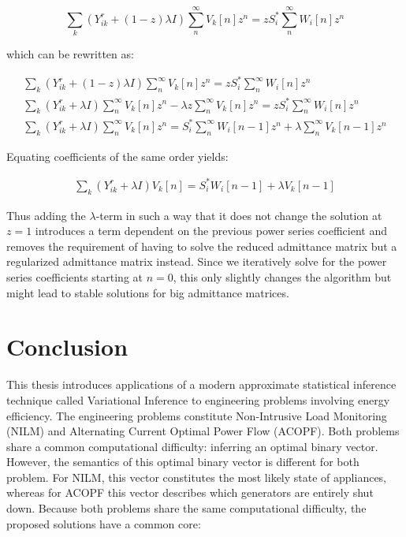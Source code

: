 \documentclass[11pt]{cmuthesis} %
\begin{document}
\begin{equation}
\sum_k (Y^r_{ik} + (1-z) \lambda I) \sum_n^{\infty} V_k[n]z^n = zS_i^*\sum_n^{\infty} W_i[n]z^n
\end{equation}

which can be rewritten as:

\begin{align}
\sum_k (Y^r_{ik} + (1-z) \lambda I) \sum_n^{\infty} V_k[n]z^n = zS_i^*\sum_n^{\infty} W_i[n]z^n\\
\sum_k (Y^r_{ik} + \lambda I) \sum_n^{\infty} V_k[n]z^n  - \lambda z\sum_n^{\infty} V_k[n]z^n = zS_i^*\sum_n^{\infty} W_i[n]z^n \\
\sum_k (Y^r_{ik} + \lambda I) \sum_n^{\infty} V_k[n]z^n  = S_i^*\sum_n^{\infty} W_i[n - 1]z^n + \lambda\sum_n^{\infty} V_k[n-1]z^n
\end{align}

Equating coefficients of the same order yields:

\begin{align}
\sum_k (Y^r_{ik} + \lambda I)  V_k[n] = S_i^*W_i[n - 1] + \lambda V_k[n-1] \label{eq:scale_embed}
\end{align}

Thus adding the $\lambda$-term in such a way that it does not change the solution at $z=1$ introduces a term dependent on the previous power series coefficient and removes the requirement of having to solve the reduced admittance matrix but a regularized admittance matrix instead. Since we iteratively solve for the power series coefficients starting at $n=0$, this only slightly changes the algorithm but might lead to stable solutions for big admittance matrices.
\fi


\chapter{Conclusion}

This thesis introduces applications of a modern approximate statistical inference technique called Variational Inference to engineering problems involving energy efficiency. The engineering problems constitute Non-Intrusive Load Monitoring (NILM) and Alternating Current Optimal Power Flow (ACOPF). Both problems share a common computational difficulty: inferring an optimal binary vector. However, the semantics of this optimal binary vector is different for both problem. For NILM, this vector constitutes the most likely state of appliances, whereas for ACOPF this vector describes which generators are entirely shut down. Because both problems share the same computational difficulty, the proposed solutions have a common core:
\end{document}
